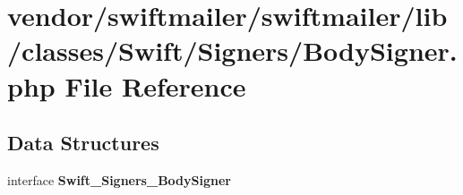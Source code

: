 \section{vendor/swiftmailer/swiftmailer/lib/classes/\+Swift/\+Signers/\+Body\+Signer.php File Reference}
\label{_body_signer_8php}
\subsection*{Data Structures}
\begin{DoxyCompactItemize}
\item 
interface {\bf Swift\+\_\+\+Signers\+\_\+\+Body\+Signer}
\end{DoxyCompactItemize}

